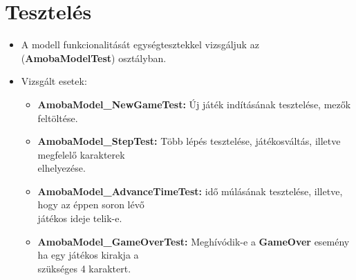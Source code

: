\documentclass[11pt,a4paper]{article}
\begin{document}
\section{Tesztelés}
\begin{itemize}
	\item A modell funkcionalitását egységtesztekkel vizsgáljuk az
	(\textbf{AmobaModelTest}) osztályban.
	\item Vizsgált esetek:
	\begin{itemize}
		\item\textbf{AmobaModel\_NewGameTest:} Új játék indításának tesztelése, mezők
		feltöltése.
		\item\textbf{AmobaModel\_StepTest:} Több lépés tesztelése, játékosváltás, illetve
		megfelelő karakterek \\ elhelyezése.
		\item\textbf{AmobaModel\_AdvanceTimeTest:} idő múlásának tesztelése, illetve, hogy
		az éppen soron lévő \\ játékos ideje telik-e.
		\item\textbf{AmobaModel\_GameOverTest:} Meghívódik-e a \textbf{GameOver} esemény
		ha egy játékos kirakja a \\ szükséges 4 karaktert.
	\end{itemize}
\end{itemize}
\end{document}

